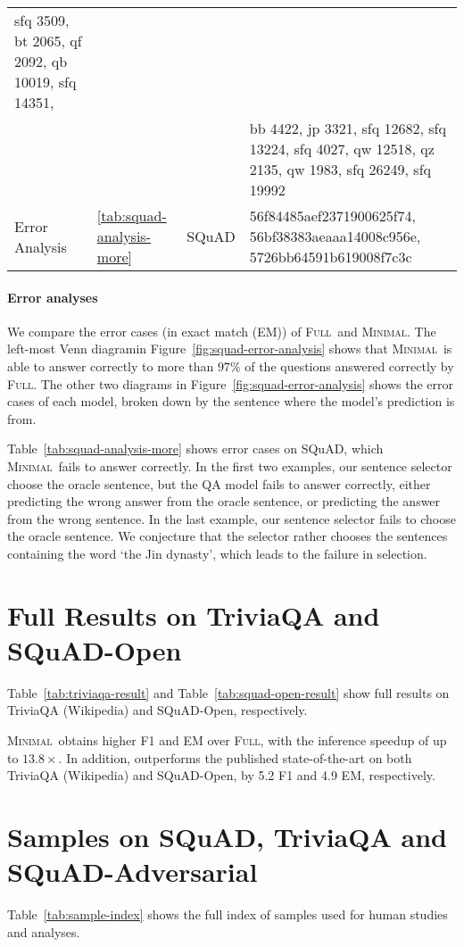 \documentclass[11pt,a4paper]{article}
\newcommand{\full}{\textsc{Full}}
\newcommand{\ours}{\textsc{Minimal}}
\newcommand{\venndiagram}{Venn diagram}
\newcommand{\reduce}{\vspace*{-3pt}}
\begin{document}
\begin{table*}[!ht]
\begin{center}
{\begin{tabular}{|l|l|l|l|}
 sfq 3509, bt 2065, qf 2092, qb 10019, sfq 14351,\\
&&& bb 4422, jp 3321, sfq 12682, sfq 13224, sfq 4027,
 qw 12518, qz 2135, qw 1983, sfq 26249, sfq 19992\\
 \hline
Error Analysis & \ref{tab:squad-analysis-more} & SQuAD & 56f84485aef2371900625f74, 56bf38383aeaaa14008c956e, 5726bb64591b619008f7c3c \\
 \hline
\end{tabular}
}
\end{center}
\reduce
\caption{QuestionIDs of samples used for human studies and analyses.} 
\label{tab:sample-index}
\end{table*}
 
\paragraph{Error analyses}
We compare the error cases (in exact match (EM)) of \full~and \ours. The left-most \venndiagram in Figure~\ref{fig:squad-error-analysis}  shows that \ours~is able to answer correctly to more than $97\%$ of the questions answered correctly by \full. The other two diagrams in Figure~\ref{fig:squad-error-analysis}  shows the error cases of each model, broken down by the sentence where the model's prediction is from.

Table~\ref{tab:squad-analysis-more} shows error cases on SQuAD, which \ours~fails to answer correctly. In the first two examples, our sentence selector choose the oracle sentence, but the QA model fails to answer correctly, either predicting the wrong answer from the oracle sentence, or predicting the answer from the wrong sentence. In the last example, our sentence selector fails to choose the oracle sentence. We conjecture that the selector rather chooses the sentences containing the word `the Jin dynasty', which leads to the failure in selection. \section{Full Results on TriviaQA and SQuAD-Open}\label{sec:app-results}Table~\ref{tab:triviaqa-result} and Table~\ref{tab:squad-open-result} show full results on TriviaQA (Wikipedia) and SQuAD-Open, respectively.

\ours~obtains higher F1 and EM over \full, with the inference speedup of up to $13.8\times$.
In addition, outperforms the published state-of-the-art on both TriviaQA (Wikipedia) and SQuAD-Open, by 5.2 F1 and 4.9 EM, respectively. \section{Samples on SQuAD, TriviaQA and SQuAD-Adversarial}\label{sec:app-samples}Table~\ref{tab:sample-index} shows the full index of samples used for human studies and analyses.
 
\end{document}
